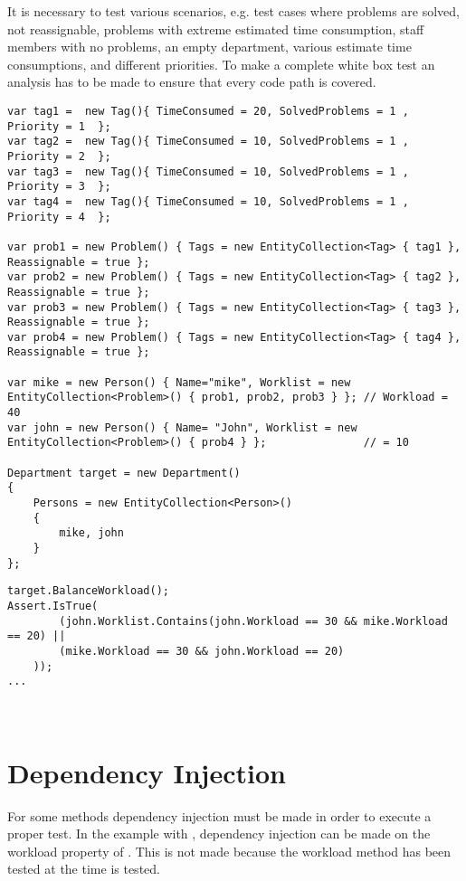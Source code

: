 It is necessary to test various scenarios, e.g. test cases where problems are solved, not reassignable, problems with extreme estimated time consumption, staff members with no problems, an empty department, various estimate time consumptions, and different priorities. To make a complete white box test an analysis has to be made to ensure that every code path is covered. 

\begin{lstlisting}[style=sourceCode, caption=\myCaption{The arrange phase of the unit test of balance workload}, label=lst:balanceWorkloadTest2arrange,name=src:balance,float=p]
var tag1 =  new Tag(){ TimeConsumed = 20, SolvedProblems = 1 , Priority = 1  };  
var tag2 =  new Tag(){ TimeConsumed = 10, SolvedProblems = 1 , Priority = 2  }; 
var tag3 =  new Tag(){ TimeConsumed = 10, SolvedProblems = 1 , Priority = 3  }; 
var tag4 =  new Tag(){ TimeConsumed = 10, SolvedProblems = 1 , Priority = 4  }; 

var prob1 = new Problem() { Tags = new EntityCollection<Tag> { tag1 }, Reassignable = true };
var prob2 = new Problem() { Tags = new EntityCollection<Tag> { tag2 }, Reassignable = true };
var prob3 = new Problem() { Tags = new EntityCollection<Tag> { tag3 }, Reassignable = true };
var prob4 = new Problem() { Tags = new EntityCollection<Tag> { tag4 }, Reassignable = true };
   
var mike = new Person() { Name="mike", Worklist = new EntityCollection<Problem>() { prob1, prob2, prob3 } }; // Workload = 40
var john = new Person() { Name= "John", Worklist = new EntityCollection<Problem>() { prob4 } };               // = 10

Department target = new Department()
{
    Persons = new EntityCollection<Person>()
    {
        mike, john
    }
};
\end{lstlisting}
\begin{lstlisting}[style=sourceCode, caption=\myCaption{An example unit test which tests a specific instance of the balanceWorkload method.}, label=lst:balanceWorkloadTestAssert,name=src:balance,float=p]
target.BalanceWorkload();
Assert.IsTrue(
		(john.Worklist.Contains(john.Workload == 30 && mike.Workload == 20) ||
		(mike.Workload == 30 && john.Workload == 20)
	));
...
\end{lstlisting} \
\nopagebreak[4] \
\section{Dependency Injection}
\label{sec:independencyInjection}
For some methods dependency injection must be made in order to execute a proper test. 
In the example with , dependency injection can be made on the workload property of . 
This is not made because the workload method has been tested at the time  is tested.

